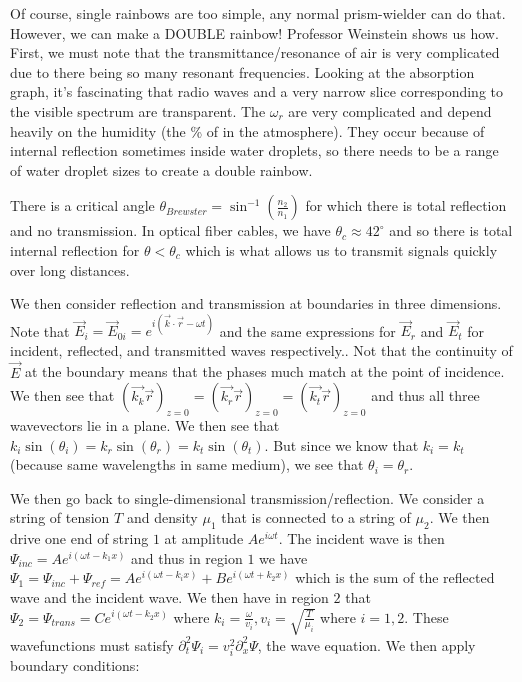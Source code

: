 \documentclass{report}
\begin{document}
Of course, single rainbows are too simple, any normal prism-wielder can do that. However, we can make a DOUBLE rainbow! Professor Weinstein shows us how. First, we must note that the transmittance/resonance of air is very complicated due to there being so many resonant frequencies. Looking at the absorption graph, it's fascinating that radio waves and a very narrow slice corresponding to the visible spectrum are transparent. The $\omega_r$ are very complicated and depend heavily on the humidity (the \% of  in the atmosphere). They occur because of internal reflection sometimes inside water droplets, so there needs to be a range of water droplet sizes to create a double rainbow. 

There is a critical angle $\theta_{Brewster} = \sin^{-1}(\frac{n_2}{n_1})$ for which there is total reflection and no transmission. In optical fiber cables, we have $\theta_c \approx 42^{\circ}$ and so there is total internal reflection for $\theta < \theta_c$ which is what allows us to transmit signals quickly over long distances.

We then consider reflection and transmission at boundaries in three dimensions. Note that $\vec{E}_i = \vec{E}_{0i} = e^{i(\vec{k}\cdot\vec{r} - \omega t)}$ and the same expressions for $\vec{E}_r$ and $\vec{E}_t$ for incident, reflected, and transmitted waves respectively.. Not that the continuity of $\vec{E}$ at the boundary means that the phases much match at the point of incidence. We then see that $(\vec{k_k}\vec{r})_{z = 0} = (\vec{k_r}\vec{r})_{z = 0} = (\vec{k_t}\vec{r})_{z = 0}$ and thus all three wavevectors lie in a plane. We then see that $k_i\sin(\theta_i) = k_r\sin(\theta_r) = k_t\sin(\theta_t)$. But since we know that $k_i = k_t$ (because same wavelengths in same medium), we see that $\theta_i = \theta_r$. 

We then go back to single-dimensional transmission/reflection. We consider a string of tension $T$ and density $\mu_1$ that is connected to a string of $\mu_2$. We then drive one end of string $1$ at amplitude $Ae^{i\omega t}$. The incident wave is then $\Psi_{inc} = Ae^{i(\omega t - k_1x)}$ and thus in region $1$ we have $\Psi_1 = \Psi_{inc} + \Psi_{ref} = Ae^{i(\omega t - k_ix)} + Be^{i(\omega t + k_2x)}$ which is the sum of the reflected wave and the incident wave. We then have in region $2$ that $\Psi_2 = \Psi_{trans} = Ce^{i(\omega t - k_2 x)}$ where $k_i = \frac{\omega}{v_i}, v_i = \sqrt{\frac{T}{\mu_i}}$ where $i = 1,2$. These wavefunctions must satisfy $\partial_t^2\Psi_i = v_i^2\partial_x^2\Psi$, the wave equation. We then apply boundary conditions: 
\end{document}
